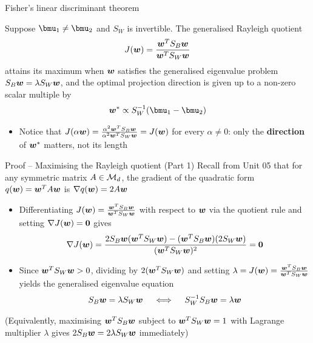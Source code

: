 \documentclass[aspectratio=169]{beamer}\usepackage[]{graphicx}\usepackage[]{xcolor}
\begin{document}
\begin{frame}{Fisher's linear discriminant theorem}
    \begin{importanttheorem}
        \label{th:fisher-lda}
        Suppose $\bmu_1 \neq \bmu_2$ and $S_W$ is invertible. The generalised Rayleigh quotient
        \[
            J(\bm{w}) = \frac{\bm{w}^T S_B \bm{w}}{\bm{w}^T S_W \bm{w}}
        \]
        attains its maximum when $\bm{w}$ satisfies the generalised eigenvalue problem $S_B \bm{w} = \lambda S_W \bm{w}$, and the optimal projection direction is given up to a non-zero scalar multiple by
        \[
            \bw^* \propto S_W^{-1}(\bmu_1 - \bmu_2)
        \]
    \end{importanttheorem}
    \vfill
    \begin{itemize}
        \item Notice that $J(\alpha \bm{w}) = \frac{\alpha^2 \bm{w}^T S_B \bm{w}}{\alpha^2 \bm{w}^T S_W \bm{w}} = J(\bm{w})$ for every $\alpha \neq 0$: only the \textbf{direction} of $\bm{w}^*$ matters, not its length
    \end{itemize}
\end{frame}


\begin{frame}[red]{Proof -- Maximising the Rayleigh quotient (Part 1)}
    Recall from Unit 05 that for any symmetric matrix $A \in \mathcal{M}_d$, the gradient of the quadratic form $q(\bm{w}) = \bm{w}^T A \bm{w}$ is $\nabla q(\bm{w}) = 2A\bm{w}$
    \vfill
    \begin{itemize}
        \item Differentiating $J(\bm{w}) = \frac{\bm{w}^T S_B \bm{w}}{\bm{w}^T S_W \bm{w}}$ with respect to $\bm{w}$ via the quotient rule and setting $\nabla J(\bw) = \b0$ gives
        \[
            \nabla J(\bw) = \frac{2S_B\bw(\bw^T S_W \bw) - (\bw^T S_B \bw)(2S_W\bw)}{(\bw^T S_W \bw)^2} = \b0
        \]
        \item Since $\bm{w}^T S_W \bm{w} > 0$, dividing by $2(\bm{w}^T S_W \bm{w})$ and setting $\lambda = J(\bm{w}) = \frac{\bm{w}^T S_B \bm{w}}{\bm{w}^T S_W \bm{w}}$ yields the generalised eigenvalue equation
        \[
            S_B \bm{w} = \lambda S_W \bm{w} \quad \iff \quad S_W^{-1} S_B \bm{w} = \lambda \bm{w}
        \]
    \end{itemize}
    \vfill
    {\footnotesize (Equivalently, maximising $\bm{w}^T S_B \bm{w}$ subject to $\bm{w}^T S_W \bm{w} = 1$ with Lagrange multiplier $\lambda$ gives $2S_B \bm{w} = 2\lambda S_W \bm{w}$ immediately)}
\end{frame}
\end{document}
